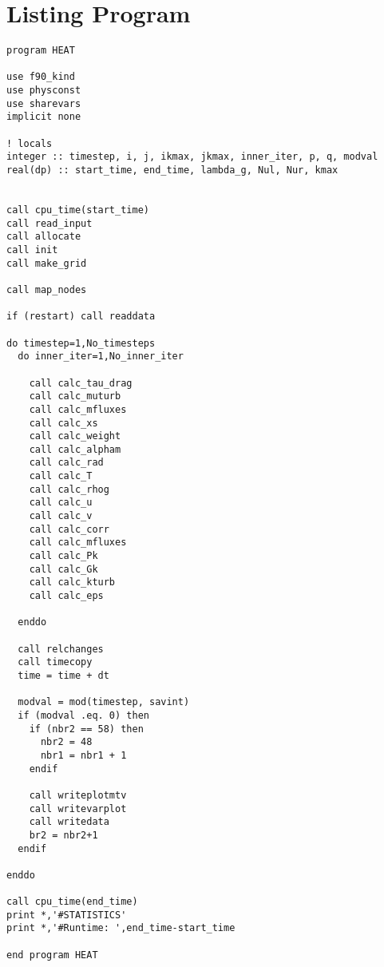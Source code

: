 \chapter{Listing Program}
\singlespacing

\lstset{
language=[90]fortran,
basicstyle=\footnotesize,
numberstyle=\tiny,
numbers=left,
stepnumber=1,
numbersep=10pt,
numberblanklines=false,
columns=flexible,
breaklines=true,
breakindent=10pt
}
\lstset{commentstyle=\textit}

\begin{lstlisting}
program HEAT

use f90_kind
use physconst
use sharevars
implicit none

! locals
integer :: timestep, i, j, ikmax, jkmax, inner_iter, p, q, modval
real(dp) :: start_time, end_time, lambda_g, Nul, Nur, kmax


call cpu_time(start_time)
call read_input
call allocate
call init
call make_grid

call map_nodes

if (restart) call readdata

do timestep=1,No_timesteps
  do inner_iter=1,No_inner_iter

    call calc_tau_drag
    call calc_muturb
    call calc_mfluxes
    call calc_xs
    call calc_weight
    call calc_alpham
    call calc_rad
    call calc_T
    call calc_rhog
    call calc_u
    call calc_v
    call calc_corr
    call calc_mfluxes
    call calc_Pk
    call calc_Gk
    call calc_kturb
    call calc_eps

  enddo

  call relchanges
  call timecopy
  time = time + dt

  modval = mod(timestep, savint)
  if (modval .eq. 0) then
    if (nbr2 == 58) then
      nbr2 = 48
      nbr1 = nbr1 + 1
    endif

    call writeplotmtv
    call writevarplot
    call writedata
    br2 = nbr2+1
  endif

enddo

call cpu_time(end_time)
print *,'#STATISTICS'
print *,'#Runtime: ',end_time-start_time

end program HEAT
\end{lstlisting}

